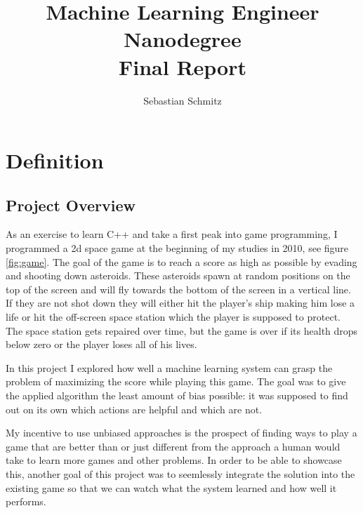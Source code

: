 \documentclass[a4paper,10pt]{article}
\title{Machine Learning Engineer Nanodegree\\Final Report}
\author{Sebastian Schmitz}
\begin{document}
\maketitle
\clearpage
\section{Definition}

\subsection{Project Overview}
As an exercise to learn C++ and take a first peak into game programming, I programmed a 2d space game at the beginning of my studies in 2010, see figure \ref{fig:game}.
The goal of the game is to reach a score as high as possible by evading and shooting down asteroids.
These asteroids spawn at random positions on the top of the screen and will fly towards the bottom of the screen in a vertical line.
If they are not shot down they will either hit the player's ship making him lose a life or hit the off-screen space station which the player is supposed to protect.
The space station gets repaired over time, but the game is over if its health drops below zero or the player loses all of his lives.

In this project I explored how well a machine learning system can grasp the problem of maximizing the score while playing this game.
The goal was to give the applied algorithm the least amount of bias possible: it was supposed to find out on its own which actions are helpful and which are not.

My incentive to use unbiased approaches is the prospect of finding ways to play a game that are better than or just different from the approach a human would take to learn more games and other problems.
In order to be able to showcase this, another goal of this project was to seemlessly integrate the solution into the existing game so that we can watch what the system learned and how well it performs.

\end{document}
